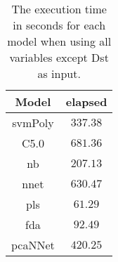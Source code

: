 \begin{table}[!ht]
	\centering
	\begin{tabular}{|c|c|}
		\hline
		Model & elapsed \\ \hline
		svmPoly & $337.38$ \\ \hline
		C5.0 & $681.36$ \\ \hline
		nb & $207.13$ \\ \hline
		nnet & $630.47$ \\ \hline
		pls & $61.29$ \\ \hline
		fda & $92.49$ \\ \hline
		pcaNNet & $420.25$ \\ \hline
	\end{tabular}
	\caption{The execution time in seconds for each model when using all variables except Dst as input.}
	\label{tab:time:noDst:total}
\end{table}
